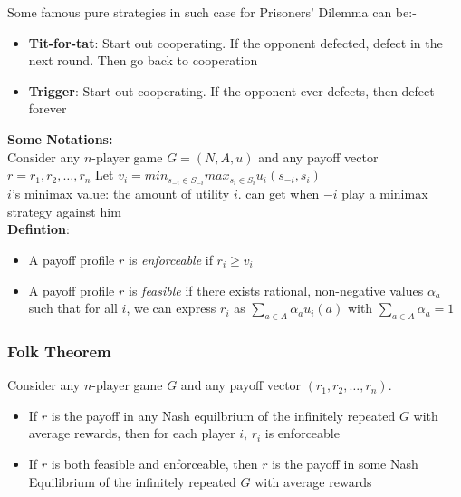 Some famous pure strategies in such case for Prisoners' Dilemma can be:-
\begin{itemize}
\item \textbf{Tit-for-tat}: Start out cooperating. If the opponent defected, defect in the next round. Then go back to cooperation
\item \textbf{Trigger}: Start out cooperating. If the opponent ever defects, then defect forever
\end{itemize}

\textbf{Some Notations:}\\

Consider any $n$-player game $G = (N, A, u)$ and any payoff vector $r = r_1, r_2, \dots , r_n$\newline
Let $v_i = min_{s_{-i}\in S_{-i}} max_{s_i \in S_i} u_i(s_{-i}, s_i)$\\
$i$'s minimax value: the amount of utility $i$. can get when $-i $ play a minimax strategy against him\\

\textbf{Defintion}:
\begin{itemize}
\item A payoff profile $r$ is \textit{enforceable} if $r_i \geq v_i$
\item A payoff profile $r$ is \textit{feasible} if there exists rational, non-negative values $\alpha_a$ such that for all $i$, we can express $r_i$ as $\sum_{a\in A} \alpha_a u_i(a) $ with $\sum_{a\in A} \alpha_a = 1$
\end{itemize}

\subsubsection{Folk Theorem}

Consider any $n$-player game $G$ and any payoff vector $(r_1, r_2, \dots, r_n)$.
\begin{itemize}
\item If $r$ is the payoff in any Nash equilbrium of the infinitely repeated $G$ with average rewards, then for each player $i$, $r_i$ is enforceable
\item If $r$ is both feasible and enforceable, then $r$ is the payoff in some Nash Equilibrium of the infinitely repeated $G$ with average rewards
\end{itemize}

